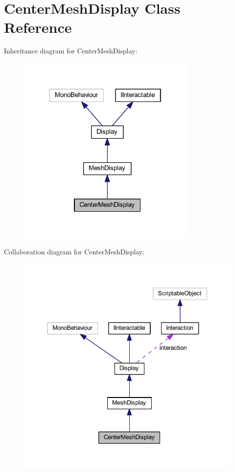 \hypertarget{class_center_mesh_display}{}\section{Center\+Mesh\+Display Class Reference}
\label{class_center_mesh_display}


Inheritance diagram for Center\+Mesh\+Display\+:
\nopagebreak
\begin{figure}[H]
\begin{center}
\leavevmode
\includegraphics[width=250pt]{class_center_mesh_display__inherit__graph}
\end{center}
\end{figure}


Collaboration diagram for Center\+Mesh\+Display\+:
\nopagebreak
\begin{figure}[H]
\begin{center}
\leavevmode
\includegraphics[width=344pt]{class_center_mesh_display__coll__graph}
\end{center}
\end{figure}
